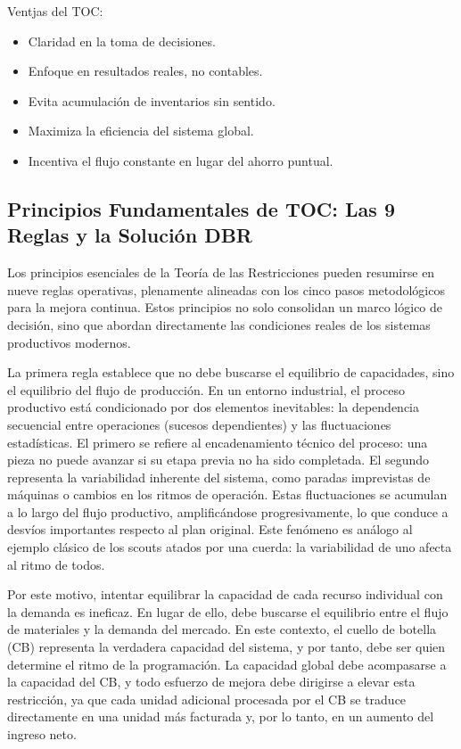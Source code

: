 \documentclass[a4paper,oneside,11pt]{article}
\begin{document}
Ventjas del TOC: 
\begin{itemize}
    \item Claridad en la toma de decisiones.
    \item Enfoque en resultados reales, no contables.
    \item Evita acumulación de inventarios sin sentido.
    \item Maximiza la eficiencia del sistema global.
    \item Incentiva el flujo constante en lugar del ahorro puntual.
\end{itemize}

\subsection{Principios Fundamentales de TOC: Las 9 Reglas y la Solución DBR}

Los principios esenciales de la Teoría de las Restricciones pueden resumirse en nueve reglas operativas, plenamente alineadas con los cinco pasos metodológicos para la mejora continua. Estos principios no solo consolidan un marco lógico de decisión, sino que abordan directamente las condiciones reales de los sistemas productivos modernos.

La primera regla establece que no debe buscarse el equilibrio de capacidades, sino el equilibrio del flujo de producción. En un entorno industrial, el proceso productivo está condicionado por dos elementos inevitables: la dependencia secuencial entre operaciones (sucesos dependientes) y las fluctuaciones estadísticas. El primero se refiere al encadenamiento técnico del proceso: una pieza no puede avanzar si su etapa previa no ha sido completada. El segundo representa la variabilidad inherente del sistema, como paradas imprevistas de máquinas o cambios en los ritmos de operación. Estas fluctuaciones se acumulan a lo largo del flujo productivo, amplificándose progresivamente, lo que conduce a desvíos importantes respecto al plan original. Este fenómeno es análogo al ejemplo clásico de los scouts atados por una cuerda: la variabilidad de uno afecta al ritmo de todos.

Por este motivo, intentar equilibrar la capacidad de cada recurso individual con la demanda es ineficaz. En lugar de ello, debe buscarse el equilibrio entre el flujo de materiales y la demanda del mercado. En este contexto, el cuello de botella (CB) representa la verdadera capacidad del sistema, y por tanto, debe ser quien determine el ritmo de la programación. La capacidad global debe acompasarse a la capacidad del CB, y todo esfuerzo de mejora debe dirigirse a elevar esta restricción, ya que cada unidad adicional procesada por el CB se traduce directamente en una unidad más facturada y, por lo tanto, en un aumento del ingreso neto.
\end{document}
